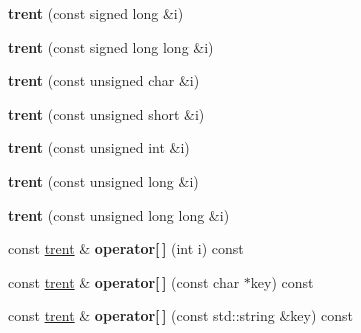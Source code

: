 \begin{DoxyCompactItemize}
\item 
{\bfseries trent} (const signed long \&i)\hypertarget{classgxx_1_1trent_a7c357e191baa7a2d6610c8a329d87fae}{}\label{classgxx_1_1trent_a7c357e191baa7a2d6610c8a329d87fae}

\item 
{\bfseries trent} (const signed long long \&i)\hypertarget{classgxx_1_1trent_ac962b3f1d8f816a63963cf7f4d8e0b9a}{}\label{classgxx_1_1trent_ac962b3f1d8f816a63963cf7f4d8e0b9a}

\item 
{\bfseries trent} (const unsigned char \&i)\hypertarget{classgxx_1_1trent_aedb6c0ccafb8fb38619373f307de3504}{}\label{classgxx_1_1trent_aedb6c0ccafb8fb38619373f307de3504}

\item 
{\bfseries trent} (const unsigned short \&i)\hypertarget{classgxx_1_1trent_a53851a5f4b7d7d9c7bb39138f8b53e26}{}\label{classgxx_1_1trent_a53851a5f4b7d7d9c7bb39138f8b53e26}

\item 
{\bfseries trent} (const unsigned int \&i)\hypertarget{classgxx_1_1trent_a6350b9dcef042cea6233aa536bcf49f1}{}\label{classgxx_1_1trent_a6350b9dcef042cea6233aa536bcf49f1}

\item 
{\bfseries trent} (const unsigned long \&i)\hypertarget{classgxx_1_1trent_a0f1133f6b1f3ad45f37d18ee43146eb4}{}\label{classgxx_1_1trent_a0f1133f6b1f3ad45f37d18ee43146eb4}

\item 
{\bfseries trent} (const unsigned long long \&i)\hypertarget{classgxx_1_1trent_aee8daaf99f26560aec5966eab402d7e5}{}\label{classgxx_1_1trent_aee8daaf99f26560aec5966eab402d7e5}

\item 
const \hyperlink{classgxx_1_1trent}{trent} \& {\bfseries operator\mbox{[}$\,$\mbox{]}} (int i) const \hypertarget{classgxx_1_1trent_a270d89f8439aee92b33e76aa3de81a3b}{}\label{classgxx_1_1trent_a270d89f8439aee92b33e76aa3de81a3b}

\item 
const \hyperlink{classgxx_1_1trent}{trent} \& {\bfseries operator\mbox{[}$\,$\mbox{]}} (const char $\ast$key) const \hypertarget{classgxx_1_1trent_ab3b7b447271ad9ca3374cc339608b004}{}\label{classgxx_1_1trent_ab3b7b447271ad9ca3374cc339608b004}

\item 
const \hyperlink{classgxx_1_1trent}{trent} \& {\bfseries operator\mbox{[}$\,$\mbox{]}} (const std\+::string \&key) const \hypertarget{classgxx_1_1trent_ab9f630ab9569976ff99feeca88feed66}{}\label{classgxx_1_1trent_ab9f630ab9569976ff99feeca88feed66}


\end{DoxyCompactItemize}
